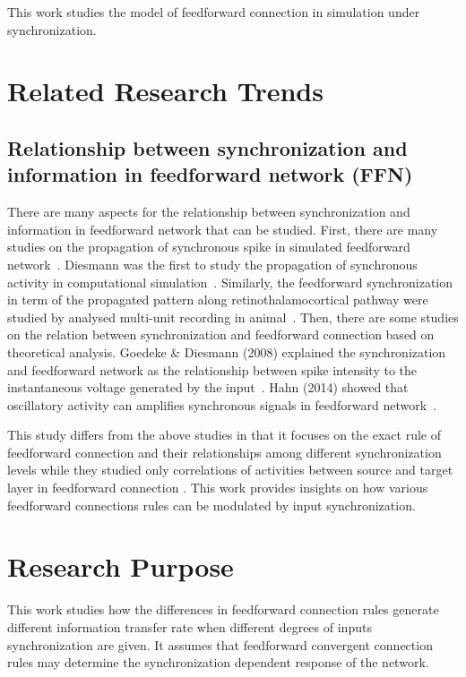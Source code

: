 This work studies the model of feedforward connection in simulation under synchronization.

\section{Related Research Trends}
\subsection{Relationship between synchronization and information in feedforward network (FFN)}

There are many aspects for the relationship between synchronization and information in feedforward network that can be studied. First, there are many studies on the propagation of synchronous spike in simulated feedforward network~\cite{abeles2004modeling,diesmann1999stable, kumar2008conditions}. Diesmann was the first to study the propagation of synchronous activity in computational simulation~\cite{diesmann1999stable}. Similarly, the feedforward synchronization in term of the propagated pattern along retinothalamocortical pathway were studied by analysed multi-unit recording in animal~\cite{neuenschwander2002feed}.
Then, there are some studies on the relation between synchronization and feedforward connection based on theoretical analysis. Goedeke \& Diesmann (2008) explained the synchronization and feedforward network as the relationship between spike intensity to the instantaneous voltage generated by the input~\cite{goedeke2008mechanism}. 
Hahn (2014) showed that oscillatory activity can amplifies synchronous signals in feedforward network~\cite{hahn2014communication}.

This study differs from the above studies in that it focuses on the exact rule of feedforward connection and their relationships among different synchronization levels while they studied only correlations of activities between source and target layer in feedforward connection . This work provides insights on how various feedforward connections rules can be modulated by input synchronization.


\section{Research Purpose}
This work studies how the differences in feedforward connection rules generate different information transfer rate when different degrees of inputs synchronization are given.
It assumes that feedforward convergent connection rules may determine the synchronization dependent response of the network.
